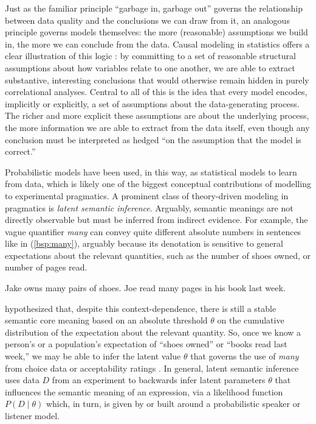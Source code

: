 \documentclass[fleqn,reqno,12pt]{article}
\begin{document}
Just as the familiar principle ``garbage in, garbage out'' governs the relationship between data quality and the conclusions we can draw from it, an analogous principle governs models themselves: the more (reasonable) assumptions we build in, the more we can conclude from the data.
Causal modeling in statistics offers a clear illustration of this logic \citep{Pearl2009:Causal-inferenc}:
by committing to a set of reasonable structural assumptions about how variables relate to one another, we are able to extract substantive, interesting conclusions that would otherwise remain hidden in purely correlational analyses.
Central to all of  this is the idea that every model encodes, implicitly or explicitly, a set of assumptions about the data-generating process.
The richer and more explicit these assumptions are about the underlying process, the more information we are able to extract from the data itself, even though any conclusion must be interpreted as hedged ``on the assumption that the model is correct.''

Probabilistic models have been used, in this way, as statistical models to learn from data, which is likely one of the biggest conceptual contributions of modelling to experimental pragmatics.
A prominent class of theory-driven modeling in pragmatics is \emph{latent semantic inference}.
Arguably, semantic meanings are not directly observable but must be inferred from indirect evidence.
For example, the vague quantifier \emph{many} can convey quite different absolute numbers in sentences like in  (\ref{bsp:many}), arguably because its denotation is sensitive to general expectations about the relevant quantities, such as the number of shoes owned, or number of pages read.
%
\begin{exe}
  \label{bsp:many}
  \ex
  \begin{xlist}
    \ex Jake owns many pairs of shoes.
    \ex Joe read many pages in his book last week.
  \end{xlist}
\end{exe}
%
\citet{FernandoKamp1996:Expecting-Many} hypothesized that, despite this context-dependence, there is still a stable semantic core meaning based on an absolute threshold $\theta$ on the cumulative distribution of the expectation about the relevant quantity.
So, once we know a person's or a population's expectation of ``shoes owned'' or ``books read last week,'' we may be able to infer the latent value $\theta$ that governs the use of \emph{many} from choice data or acceptability ratings \citep{FrankeScholler2016:Semantic-values,ReeseJasbi2026:Resolving-the-V}.
In general, latent semantic inference uses data $D$ from an experiment to backwards infer latent parameters $\theta$ that influences the semantic meaning of an expression, via a likelihood function $P(D \mid \theta)$ which, in turn, is given by or built around a probabilistic speaker or listener model.
\end{document}
